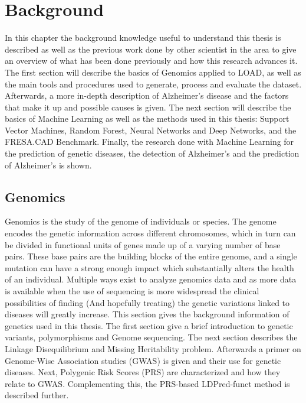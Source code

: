 \chapter{Background} \label{background}
In this chapter the background knowledge useful to understand this thesis is described as well as the previous work done by other scientist in the area to give an overview of what has been done previously and how this research advances it. The first section will describe the basics of Genomics applied to LOAD, as well as the main tools and procedures used to generate, process and evaluate the dataset. Afterwards, a more in-depth description of Alzheimer's disease and the factors that make it up and possible causes is given.  The next section will describe the basics of Machine Learning as well as the methods used in this thesis: Support Vector Machines, Random Forest, Neural Networks and Deep Networks, and the FRESA.CAD Benchmark.  Finally, the research done with Machine Learning for the prediction of genetic diseases, the detection of Alzheimer's and the prediction of Alzheimer's is shown.

\section{Genomics}

Genomics is the study of the genome of individuals or species. The genome encodes the genetic information across different chromosomes, which in turn can be divided in functional units of genes made up of a varying number of base pairs. These base pairs are the building blocks of the entire genome, and a single mutation can have a strong enough impact which substantially alters the health of an individual. Multiple ways exist to analyze genomics data and as more data is available when the use of sequencing is more widespread the clinical possibilities of finding (And hopefully treating) the genetic variations linked to diseases will greatly increase.
\newpage
This section gives the background information of genetics used in this thesis. The first section give a brief introduction to genetic variants, polymorphisms and Genome sequencing. The next section describes the Linkage Disequilibrium and Missing Heritability problem. Afterwards a primer on Genome-Wise Association studies (GWAS) is given and their use for genetic diseases. Next, Polygenic Risk Scores (PRS) are characterized and how they relate to GWAS. Complementing this, the PRS-based LDPred-funct method is described further.

